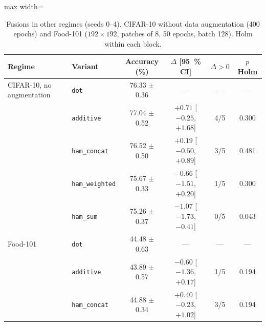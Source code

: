 
\begin{table}[!t]
\centering
\small
\caption{Fusions in other regimes (seeds 0--4). CIFAR-10 without data augmentation (400 epochs) and Food-101 ($192\times192$, patches of 8, 50 epochs, batch 128). Holm within each block.}
\label{tab:otros}
\begin{adjustbox}{max width=\linewidth}
\begin{tabular}{llcccc}
\toprule
Regime & Variant & Accuracy (\%) & $\Delta$ [95~\% CI] & $\Delta>0$ & $p$ Holm \\
\midrule
CIFAR-10, no augmentation & \texttt{dot} & 76.33 $\pm$ 0.36 & --- & --- & --- \\
 & \texttt{additive} & 77.04 $\pm$ 0.52 & $+0.71$ [$-0.25$, $+1.68$] & 4/5 & 0.300 \\
 & \texttt{ham\_concat} & 76.52 $\pm$ 0.50 & $+0.19$ [$-0.50$, $+0.89$] & 3/5 & 0.481 \\
 & \texttt{ham\_weighted} & 75.67 $\pm$ 0.33 & $-0.66$ [$-1.51$, $+0.20$] & 1/5 & 0.300 \\
 & \texttt{ham\_sum} & 75.26 $\pm$ 0.37 & $-1.07$ [$-1.73$, $-0.41$] & 0/5 & 0.043 \\
\midrule
Food-101 & \texttt{dot} & 44.48 $\pm$ 0.63 & --- & --- & --- \\
 & \texttt{additive} & 43.89 $\pm$ 0.57 & $-0.60$ [$-1.36$, $+0.17$] & 1/5 & 0.194 \\
 & \texttt{ham\_concat} & 44.88 $\pm$ 0.34 & $+0.40$ [$-0.23$, $+1.02$] & 3/5 & 0.194 \\
\bottomrule
\end{tabular}
\end{adjustbox}
\end{table}
